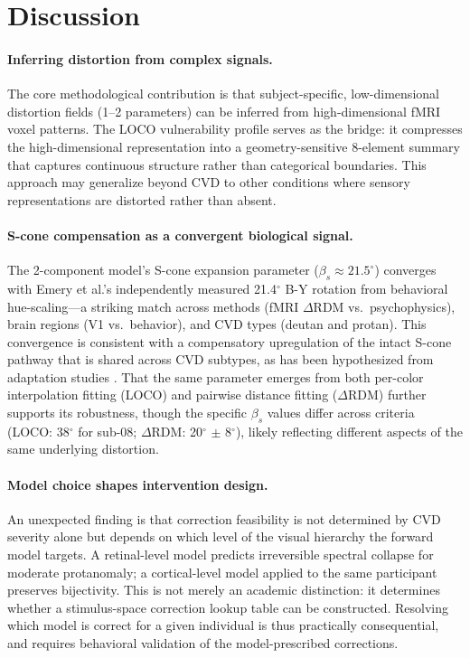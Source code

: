 \documentclass{article}
\begin{document}
\section{Discussion}
\label{sec:discussion}

\paragraph{Inferring distortion from complex signals.}
The core methodological contribution is that subject-specific, low-dimensional distortion fields (1--2 parameters) can be inferred from high-dimensional fMRI voxel patterns.
The LOCO vulnerability profile serves as the bridge: it compresses the high-dimensional representation into a geometry-sensitive 8-element summary that captures continuous structure rather than categorical boundaries.
This approach may generalize beyond CVD to other conditions where sensory representations are distorted rather than absent.

\paragraph{S-cone compensation as a convergent biological signal.}
The 2-component model's S-cone expansion parameter ($\beta_s \approx 21.5^\circ$) converges with Emery et al.'s \cite{placeholder_emery2021} independently measured 21.4$^\circ$ B-Y rotation from behavioral hue-scaling---a striking match across methods (fMRI $\Delta$RDM vs.\ psychophysics), brain regions (V1 vs.\ behavior), and CVD types (deutan and protan).
This convergence is consistent with a compensatory upregulation of the intact S-cone pathway that is shared across CVD subtypes, as has been hypothesized from adaptation studies \cite{placeholder_tregillus2021, placeholder_boehm2014}.
That the same parameter emerges from both per-color interpolation fitting (LOCO) and pairwise distance fitting ($\Delta$RDM) further supports its robustness, though the specific $\beta_s$ values differ across criteria (LOCO: 38$^\circ$ for sub-08; $\Delta$RDM: 20$^\circ$ $\pm$ 8$^\circ$), likely reflecting different aspects of the same underlying distortion.

\paragraph{Model choice shapes intervention design.}
An unexpected finding is that correction feasibility is not determined by CVD severity alone but depends on which level of the visual hierarchy the forward model targets.
A retinal-level model predicts irreversible spectral collapse for moderate protanomaly; a cortical-level model applied to the same participant preserves bijectivity.
This is not merely an academic distinction: it determines whether a stimulus-space correction lookup table can be constructed.
Resolving which model is correct for a given individual is thus practically consequential, and requires behavioral validation of the model-prescribed corrections.
\end{document}
